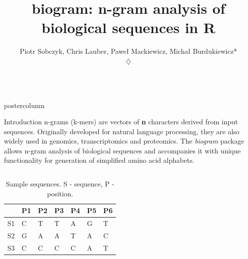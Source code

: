 \documentclass[final]{beamer}\usepackage[]{graphicx}\usepackage[]{color}
\newlength{\columnheight}
\begin{document}
\date{}

\author{Piotr Sobczyk, Chris Lauber, Pawe\l{} Mackiewicz, Micha\l{} Burdukiewicz*\\
 $\diamondsuit$ }


\title{\huge biogram: n-gram analysis of biological sequences in R}

\begin{frame}
\begin{columns}
\begin{column}{.51\textwidth}
\begin{beamercolorbox}[center,wd=\textwidth]{postercolumn}
\begin{minipage}[T]{.95\textwidth}
\parbox[t][\columnheight]{\textwidth}
{

\begin{block}{Introduction}
n-grams (k-mers) are vectors of \textbf{n} characters derived from input 
sequences. 
Originally developed for natural language processing, they are also widely used 
in genomics, transcriptomics and proteomics. The \textit{biogram} package allows 
n-gram analysis of biological sequences and accompanies it with unique 
functionality for generation of simplified amino acid alphabets.

\small{
       \begin{columns}[c] %
\begin{table}[ht]
\centering
\begin{tabular}{rllllll}
  \toprule
 & P1 & P2 & P3 & P4 & P5 & P6 \\ 
  \midrule
S1 & C & T & T & A & G & T \\ 
   \rowcolor{white}S2 & G & A & A & T & A & C \\ 
  S3 & C & C & C & C & A & T \\ 
   \bottomrule
\end{tabular}
\caption{Sample sequences.  S - sequence, 
P - position.} 
\end{table}


\end{columns}}
\end{block}}
\end{minipage}
\end{beamercolorbox}
\end{column}
\end{columns}
\end{frame}
\end{document}
